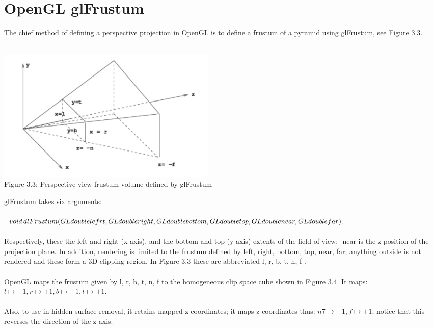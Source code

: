 \documentclass[
11pt, %
english, %
singlespacing, %
headsepline, %
]{MastersDoctoralThesis} %
\begin{document}
\section{OpenGL glFrustum}
The chief method of defining a perspective projection in OpenGL is to define a frustum of a pyramid using glFrustum, see Figure 3.3.
\\ \\
\begin{center}
\includegraphics[width=300pt]{3-3}
\\ Figure 3.3: Perspective view frustum volume defined by glFrustum
\end{center}
glFrustum takes six arguments:\\ \\
$ void \, dlFrustum(GLdouble lefrt, GLdouble right, GLdouble bottom, GLdouble top,\\ GLdouble near, GLdouble far). $ \\ \\
Respectively, these the left and right (x-axis), and the bottom and top (y-axis) extents of the field of view; -near is the z position of the projection plane. In addition, rendering is limited to the frustum defined by left, right, bottom, top, near, far; anything outside is not rendered and these
form a 3D clipping region. In Figure 3.3 these are abbreviated l, r, b, t, n, f . \\ \\
OpenGL maps the frustum given by l, r, b, t, n, f to the homogeneous clip space cube shown in Figure 3.4. It maps: $l \mapsto -1, r \mapsto +1, b \mapsto -1, t \mapsto +1$. \\ \\
Also, to use in hidden surface removal, it retains mapped z coordinates; it maps z coordinates thus: $n 7\mapsto -1, f \mapsto +1$; notice that this reverses the direction of the z axis.
\\ \\
\end{document}
